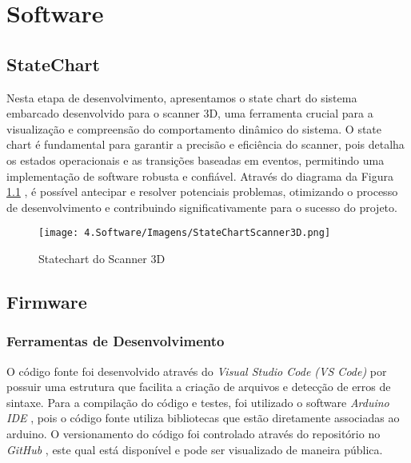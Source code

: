 
\chapter{Software}\label{cap:materialemetodos}

\section{StateChart}

Nesta etapa de desenvolvimento, apresentamos o state chart do sistema embarcado desenvolvido para o scanner 3D, uma ferramenta crucial para a visualização e compreensão do comportamento dinâmico do sistema. O state chart é fundamental para garantir a precisão e eficiência do scanner, pois detalha os estados operacionais e as transições baseadas em eventos, permitindo uma implementação de software robusta e confiável. Através do diagrama da Figura \ref{foto:state} , é possível antecipar e resolver potenciais problemas, otimizando o processo de desenvolvimento e contribuindo significativamente para o sucesso do projeto.

\begin{figure}[H]
\captionsetup{width=0.6\textwidth}%
\caption{Statechart do Scanner 3D}%
\label{foto:state}%
\texttt{[image: 4.Software/Imagens/StateChartScanner3D.png]}%
\end{figure}


\section{Firmware}

\subsection{Ferramentas de Desenvolvimento}
O código fonte foi desenvolvido através do \textit{Visual Studio Code (VS Code)} \cite{site:vscode} por possuir uma estrutura que facilita a criação de arquivos e detecção de erros de sintaxe. Para a compilação do código e testes, foi utilizado o software \textit{Arduino IDE} \cite{site:arduino}, pois o código fonte utiliza bibliotecas que estão diretamente associadas ao arduino. O versionamento do código foi controlado através do repositório no \textit{GitHub} \cite{site:reposit_git}, este qual está disponível e pode ser visualizado de maneira pública.

